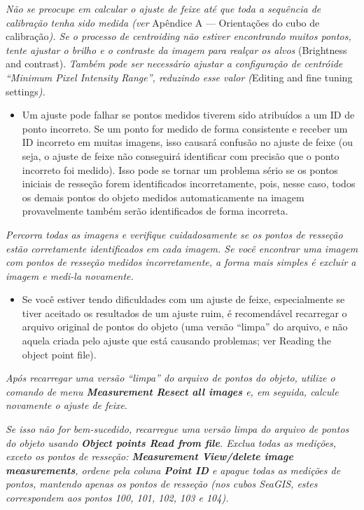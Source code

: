 \documentclass[
  12pt,
  letterpaper,
  DIV=11,
  numbers=noendperiod]{scrreprt}
\providecommand{\tightlist}{%
  \setlength{\itemsep}{0pt}\setlength{\parskip}{0pt}}
\begin{document}
\emph{Não se preocupe em calcular o ajuste de feixe até que toda a
sequência de calibração tenha sido medida (ver} Apêndice A ---
Orientações do cubo de calibração\emph{). Se o processo de centroiding
não estiver encontrando muitos pontos, tente ajustar o brilho e o
contraste da imagem para realçar os alvos} (Brightness and contrast).
\emph{Também pode ser necessário ajustar a configuração de centróide
``Minimum Pixel Intensity Range'', reduzindo esse valor (}Editing and
fine tuning settings\emph{).}

\begin{itemize}
\tightlist
\item
  Um ajuste pode falhar se pontos medidos tiverem sido atribuídos a um
  ID de ponto incorreto. Se um ponto for medido de forma consistente e
  receber um ID incorreto em muitas imagens, isso causará confusão no
  ajuste de feixe (ou seja, o ajuste de feixe não conseguirá identificar
  com precisão que o ponto incorreto foi medido). Isso pode se tornar um
  problema sério se os pontos iniciais de resseção forem identificados
  incorretamente, pois, nesse caso, todos os demais pontos do objeto
  medidos automaticamente na imagem provavelmente também serão
  identificados de forma incorreta.
\end{itemize}

\emph{Percorra todas as imagens e verifique cuidadosamente se os pontos
de resseção estão corretamente identificados em cada imagem. Se você
encontrar uma imagem com pontos de resseção medidos incorretamente, a
forma mais simples é excluir a imagem e medi-la novamente.}

\begin{itemize}
\tightlist
\item
  Se você estiver tendo dificuldades com um ajuste de feixe,
  especialmente se tiver aceitado os resultados de um ajuste ruim, é
  recomendável recarregar o arquivo original de pontos do objeto (uma
  versão ``limpa'' do arquivo, e não aquela criada pelo ajuste que está
  causando problemas; ver Reading the object point file).
\end{itemize}

\emph{Após recarregar uma versão ``limpa'' do arquivo de pontos do
objeto, utilize o comando de menu \textbf{Measurement \textbar{} Resect
all images} e, em seguida, calcule novamente o ajuste de feixe}.

\emph{Se isso não for bem-sucedido, recarregue uma versão limpa do
arquivo de pontos do objeto usando \textbf{Object points \textbar{} Read
from file}. Exclua todas as medições, exceto os pontos de resseção:
\textbf{Measurement \textbar{} View/delete image measurements}, ordene
pela coluna \textbf{Point ID} e apague todas as medições de pontos,
mantendo apenas os pontos de resseção (nos cubos SeaGIS, estes
correspondem aos pontos 100, 101, 102, 103 e 104).}
\end{document}
